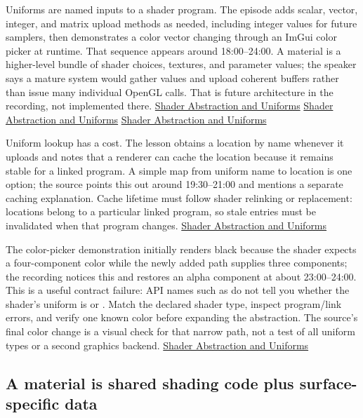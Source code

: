 Uniforms are named inputs to a shader program. The episode adds scalar, vector, integer, and matrix upload methods as needed, including integer values for future samplers, then demonstrates a color vector changing through an ImGui color picker at runtime. That sequence appears around 18:00--24:00. A material is a higher-level bundle of shader choices, textures, and parameter values; the speaker says a mature system would gather values and upload coherent buffers rather than issue many individual OpenGL calls. That is future architecture in the recording, not implemented there. \href{https://www.youtube.com/watch?v=d5wL6eZnWMU&t=1080s}{Shader Abstraction and Uniforms} \href{https://www.youtube.com/watch?v=d5wL6eZnWMU&t=1350s}{Shader Abstraction and Uniforms} \href{https://www.youtube.com/watch?v=d5wL6eZnWMU&t=1430s}{Shader Abstraction and Uniforms}

Uniform lookup has a cost. The lesson obtains a location by name whenever it uploads and notes that a renderer can cache the location because it remains stable for a linked program. A simple map from uniform name to location is one option; the source points this out around 19:30--21:00 and mentions a separate caching explanation. Cache lifetime must follow shader relinking or replacement: locations belong to a particular linked program, so stale entries must be invalidated when that program changes. \href{https://www.youtube.com/watch?v=d5wL6eZnWMU&t=1170s}{Shader Abstraction and Uniforms}

The color-picker demonstration initially renders black because the shader expects a four-component color while the newly added path supplies three components; the recording notices this and restores an alpha component at about 23:00--24:00. This is a useful contract failure: API names such as  do not tell you whether the shader's uniform is  or . Match the declared shader type, inspect program/link errors, and verify one known color before expanding the abstraction. The source's final color change is a visual check for that narrow path, not a test of all uniform types or a second graphics backend. \href{https://www.youtube.com/watch?v=d5wL6eZnWMU&t=1380s}{Shader Abstraction and Uniforms}

\subsection{A material is shared shading code plus surface-specific data}\label{06-engine-ii-ch025-a-material-is-shared-shading-code-plus-surface-specific-data}

